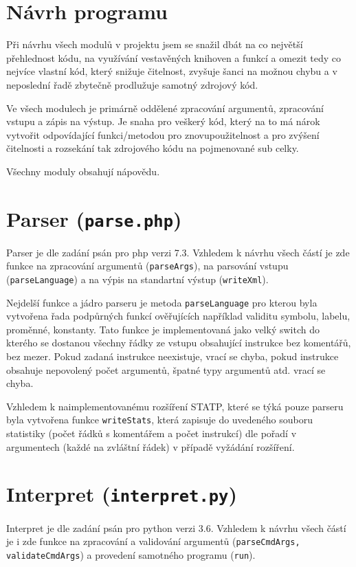 \documentclass[a4paper,10pt]{article}
\begin{document}
\hfill

\section*{Návrh programu}
  Při návrhu všech modulů v projektu jsem se snažil dbát na co největší přehlednost kódu, na
  využívání vestavěných knihoven a funkcí a omezit tedy co nejvíce vlastní kód, který snižuje
  čitelnost, zvyšuje šanci na možnou chybu a v neposlední řadě zbytečně prodlužuje samotný zdrojový kód.

  Ve všech modulech je primárně oddělené zpracování argumentů, zpracování vstupu a zápis na výstup.
  Je snaha pro veškerý kód, který na to má nárok vytvořit odpovídající funkci/metodou pro
  znovupoužitelnost a pro zvýšení čitelnosti a rozsekání tak zdrojového kódu na pojmenované sub celky.

  Všechny moduly obsahují nápovědu.

\section{Parser (\texttt{parse.php})}
  Parser je dle zadání psán pro php verzi 7.3. Vzhledem k návrhu všech částí je zde funkce na zpracování argumentů (\texttt{parseArgs}), na parsování vstupu (\texttt{parseLanguage}) a na výpis na standartní výstup (\texttt{writeXml}).

  Nejdelší funkce a jádro parseru je metoda \texttt{parseLanguage} pro kterou byla vytvořena řada podpůrných funkcí ověřujících například validitu symbolu, labelu, proměnné, konstanty.
  Tato funkce je implementovaná jako velký switch do kterého se dostanou všechny řádky ze vstupu obsahující instrukce bez komentářů, bez mezer. Pokud zadaná instrukce neexistuje, vrací se chyba, pokud instrukce obsahuje nepovolený počet argumentů, špatné typy argumentů atd. vrací se chyba.

  Vzhledem k naimplementovanému rozšíření STATP, které se týká pouze parseru byla vytvořena funkce \texttt{writeStats}, která zapisuje do uvedeného souboru statistiky (počet řádků s komentářem a počet instrukcí) dle pořadí v argumentech (každé na zvláštní řádek) v případě vyžádání rozšíření.

\section{Interpret (\texttt{interpret.py})}
  Interpret je dle zadání psán pro python verzi 3.6. Vzhledem k návrhu všech částí je i zde funkce na zpracování a validování argumentů (\texttt{parseCmdArgs, validateCmdArgs}) a provedení samotného programu (\texttt{run}).
\end{document}
